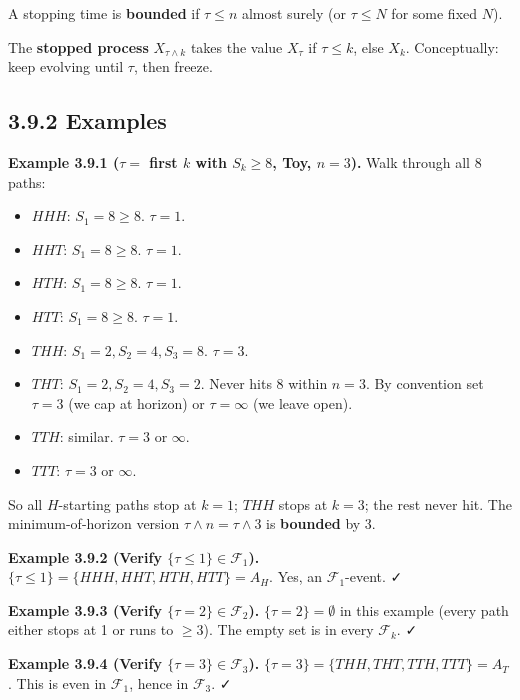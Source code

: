 \documentclass[
  10pt,
  twoside]{book}
\providecommand{\tightlist}{%
  \setlength{\itemsep}{0pt}\setlength{\parskip}{0pt}}
\begin{document}
A stopping time is \textbf{bounded} if \(\tau \le n\) almost surely (or
\(\tau \le N\) for some fixed \(N\)).

The \textbf{stopped process} \(X_{\tau \wedge k}\) takes the value
\(X_\tau\) if \(\tau \le k\), else \(X_k\). Conceptually: keep evolving
until \(\tau\), then freeze.

\subsection{3.9.2 Examples}\label{examples-19}

\textbf{Example 3.9.1 (\(\tau =\) first \(k\) with \(S_k \ge 8\), Toy,
\(n=3\)).} Walk through all 8 paths:

\begin{itemize}
\tightlist
\item
  \(HHH\): \(S_1=8 \ge 8\). \(\tau = 1\).
\item
  \(HHT\): \(S_1=8 \ge 8\). \(\tau = 1\).
\item
  \(HTH\): \(S_1=8 \ge 8\). \(\tau = 1\).
\item
  \(HTT\): \(S_1=8 \ge 8\). \(\tau = 1\).
\item
  \(THH\): \(S_1=2, S_2=4, S_3=8\). \(\tau = 3\).
\item
  \(THT\): \(S_1=2, S_2=4, S_3=2\). Never hits 8 within \(n=3\). By
  convention set \(\tau = 3\) (we cap at horizon) or \(\tau = \infty\)
  (we leave open).
\item
  \(TTH\): similar. \(\tau = 3\) or \(\infty\).
\item
  \(TTT\): \(\tau = 3\) or \(\infty\).
\end{itemize}

So all \(H\)-starting paths stop at \(k=1\); \(THH\) stops at \(k=3\);
the rest never hit. The minimum-of-horizon version
\(\tau \wedge n = \tau \wedge 3\) is \textbf{bounded} by 3.

\textbf{Example 3.9.2 (Verify \(\{\tau \le 1\} \in \mathcal F_1\)).}
\(\{\tau \le 1\} = \{HHH, HHT, HTH, HTT\} = A_H\). Yes, an
\(\mathcal F_1\)-event. ✓

\textbf{Example 3.9.3 (Verify \(\{\tau = 2\} \in \mathcal F_2\)).}
\(\{\tau = 2\} = \emptyset\) in this example (every path either stops at
1 or runs to \(\ge 3\)). The empty set is in every \(\mathcal F_k\). ✓

\textbf{Example 3.9.4 (Verify \(\{\tau = 3\} \in \mathcal F_3\)).}
\(\{\tau = 3\} = \{THH, THT, TTH, TTT\} = A_T\). This is even in
\(\mathcal F_1\), hence in \(\mathcal F_3\). ✓
\end{document}
